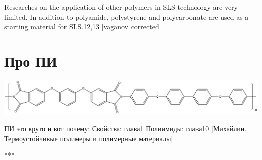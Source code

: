 \documentclass[oneside,final,14pt]{extreport}
\begin{document}
	Researches on the application of other polymers in SLS technology are very limited. In addition to polyamide, polystyrene and polycarbonate are used as a starting material for SLS.12,13
	[vaganov corrected]
	
	\section{Про ПИ}
	
	\includegraphics[width=\textwidth]{formula.png}
	
	ПИ это круто и вот почему:
	Свойства: глава1
	Полиимиды: глава10
	[Михайлин. Термоустойчивые полимеры и полимерные материалы]
	
	
	
	***
	
\end{document}
